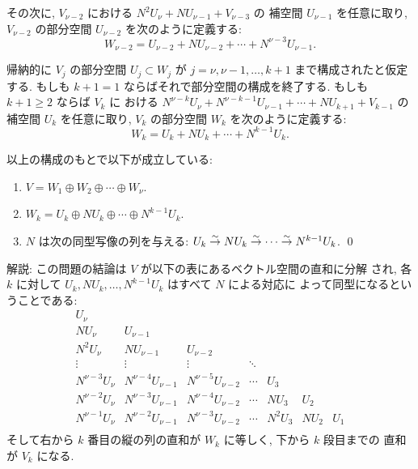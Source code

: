 \documentclass[12pt,twoside]{jarticle}
\begin{document}
その次に, $V_{\nu-2}$ における $N^2U_\nu+NU_{\nu-1}+V_{\nu-3}$ の
補空間 $U_{\nu-1}$ を任意に取り,
$V_{\nu-2}$ の部分空間 $U_{\nu-2}$ を次のように定義する:
\begin{equation*}
  W_{\nu-2} = U_{\nu-2} + NU_{\nu-2} + \cdots + N^{\nu-3}U_{\nu-1}.
\end{equation*}

帰納的に $V_j$ の部分空間 $U_j\subset W_j$ が $j=\nu,\nu-1,\dots,k+1$ 
まで構成されたと仮定する.  
もしも $k+1=1$ ならばそれで部分空間の構成を終了する.
もしも $k+1\ge 2$ ならば $V_k$ に
おける $N^{\nu-k}U_\nu+N^{\nu-k-1}U_{\nu-1}+\cdots+NU_{k+1}+V_{k-1}$ の
補空間 $U_k$ を任意に取り, $V_k$ の部分空間 $W_k$ を次のように定義する:
\begin{equation*}
  W_k = U_k + NU_k + \cdots + N^{k-1}U_k.
\end{equation*}


\begin{question}
\label{q:nilp-2}
  以上の構成のもとで以下が成立している:
  \begin{enumerate}
  \item $V = W_1\oplus W_2\oplus\cdots\oplus W_\nu$.
  \item $W_k = U_k\oplus NU_k\oplus\cdots\oplus N^{k-1}U_k$.
  \item $N$ は次の同型写像の列を与える: $
    U_k\overset\sim\rightarrow NU_k\overset\sim\rightarrow\cdots\overset\sim\rightarrow N^{k-1}U_k$. 
    \qed
  \end{enumerate}
\end{question}

\noindent
解説: この問題の結論は $V$ が以下の表にあるベクトル空間の直和に分解
され, 各 $k$ に対して $U_k,NU_k,\dots,N^{k-1}U_k$ はすべて $N$ による対応に
よって同型になるということである:
\begin{equation*}
  \begin{array}{ccccccc}
             U_\nu & & & & & & \\
          N  U_\nu &          U_{\nu-1} & & & & & \\
          N^2U_\nu &       N  U_{\nu-1} &          U_{\nu-2} & & & & \\
            \vdots &             \vdots &             \vdots & \ddots & & & \\
    N^{\nu-3}U_\nu & N^{\nu-4}U_{\nu-1} & N^{\nu-5}U_{\nu-2} & \cdots &    U_3 & & \\
    N^{\nu-2}U_\nu & N^{\nu-3}U_{\nu-1} & N^{\nu-4}U_{\nu-2} & \cdots &   NU_3 &  U_2 & \\
    N^{\nu-1}U_\nu & N^{\nu-2}U_{\nu-1} & N^{\nu-3}U_{\nu-2} & \cdots & N^2U_3 & NU_2 & U_1 \\
  \end{array}
  \tag{$\ast$}
\end{equation*}
そして右から $k$ 番目の縦の列の直和が $W_k$ に等しく, 下から $k$ 段目までの
直和が $V_k$ になる.
\end{document}
